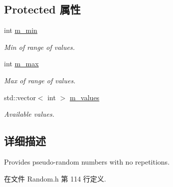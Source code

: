 \subsection*{Protected 属性}
\begin{DoxyCompactItemize}
\item 
\hypertarget{classDUtils_1_1Random_1_1UnrepeatedRandomizer_a7b59cc2afb7d7db20aa048ea95365134}{int \hyperlink{classDUtils_1_1Random_1_1UnrepeatedRandomizer_a7b59cc2afb7d7db20aa048ea95365134}{m\-\_\-min}}\label{classDUtils_1_1Random_1_1UnrepeatedRandomizer_a7b59cc2afb7d7db20aa048ea95365134}

\begin{DoxyCompactList}\small\item\em Min of range of values. \end{DoxyCompactList}\item 
\hypertarget{classDUtils_1_1Random_1_1UnrepeatedRandomizer_a5c2d23ba34589d23ac131e37feac6f6b}{int \hyperlink{classDUtils_1_1Random_1_1UnrepeatedRandomizer_a5c2d23ba34589d23ac131e37feac6f6b}{m\-\_\-max}}\label{classDUtils_1_1Random_1_1UnrepeatedRandomizer_a5c2d23ba34589d23ac131e37feac6f6b}

\begin{DoxyCompactList}\small\item\em Max of range of values. \end{DoxyCompactList}\item 
\hypertarget{classDUtils_1_1Random_1_1UnrepeatedRandomizer_adbe23146bfc61994e361d356282ce6c4}{std\-::vector$<$ int $>$ \hyperlink{classDUtils_1_1Random_1_1UnrepeatedRandomizer_adbe23146bfc61994e361d356282ce6c4}{m\-\_\-values}}\label{classDUtils_1_1Random_1_1UnrepeatedRandomizer_adbe23146bfc61994e361d356282ce6c4}

\begin{DoxyCompactList}\small\item\em Available values. \end{DoxyCompactList}\end{DoxyCompactItemize}


\subsection{详细描述}
Provides pseudo-\/random numbers with no repetitions. 

在文件 Random.\-h 第 114 行定义.



